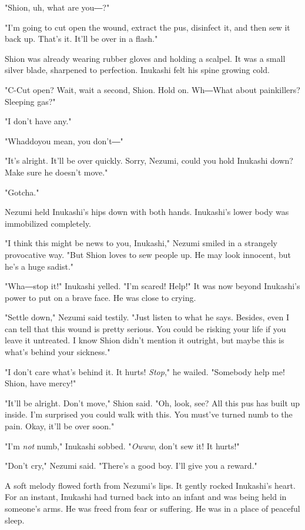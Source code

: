 "Shion, uh, what are you―?"

"I'm going to cut open the wound, extract the pus, disinfect it, and
then sew it back up. That's it. It'll be over in a flash."

Shion was already wearing rubber gloves and holding a scalpel. It was a
small silver blade, sharpened to perfection. Inukashi felt his spine
growing cold.

"C-Cut open? Wait, wait a second, Shion. Hold on. Wh―What about
painkillers? Sleeping gas?"

"I don't have any."

"Whaddoyou mean, you don't―"

"It's alright. It'll be over quickly. Sorry, Nezumi, could you hold
Inukashi down? Make sure he doesn't move."

"Gotcha."

Nezumi held Inukashi's hips down with both hands. Inukashi's lower body
was immobilized completely.

"I think this might be news to you, Inukashi," Nezumi smiled in a
strangely provocative way. "But Shion loves to sew people up. He may
look innocent, but he's a huge sadist."

"Wha―stop it!" Inukashi yelled. "I'm scared! Help!" It was now beyond
Inukashi's power to put on a brave face. He was close to crying.

"Settle down," Nezumi said testily. "Just listen to what he says.
Besides, even I can tell that this wound is pretty serious. You could be
risking your life if you leave it untreated. I know Shion didn't mention
it outright, but maybe this is what's behind your sickness."

"I don't care what's behind it. It hurts! \emph{Stop}," he wailed. "Somebody
help me! Shion, have mercy!"

"It'll be alright. Don't move," Shion said. "Oh, look, see? All this pus
has built up inside. I'm surprised you could walk with this. You must've
turned numb to the pain. Okay, it'll be over soon."

"I'm \emph{not} numb," Inukashi sobbed. "\emph{Owww}, don't sew it! It hurts!"

"Don't cry," Nezumi said. "There's a good boy. I'll give you a reward."

A soft melody flowed forth from Nezumi's lips. It gently rocked
Inukashi's heart. For an instant, Inukashi had turned back into an
infant and was being held in someone's arms. He was freed from fear or
suffering. He was in a place of peaceful sleep.

